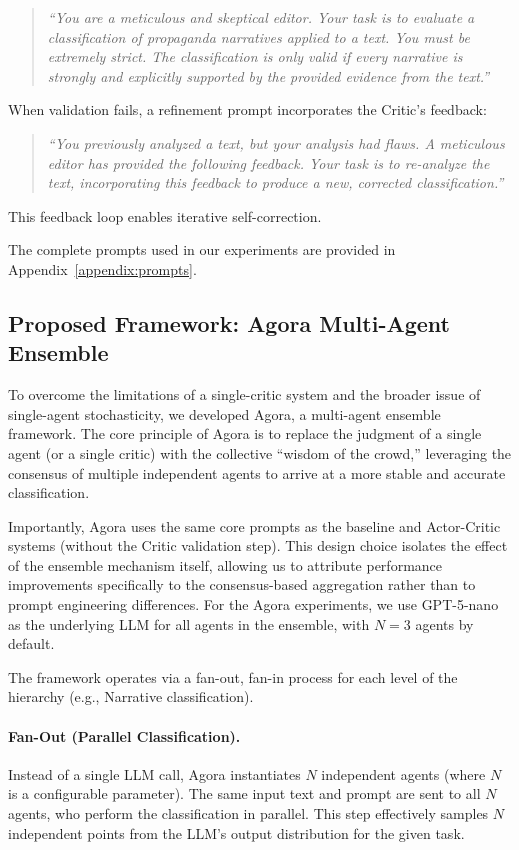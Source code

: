 \begin{quote}
    \small
\textit{``You are a meticulous and skeptical editor. Your task is to evaluate a classification of propaganda narratives applied to a text. You must be extremely strict. The classification is only valid if every narrative is strongly and explicitly supported by the provided evidence from the text.''}
\end{quote}

\noindent When validation fails, a refinement prompt incorporates the Critic's feedback: 
\begin{quote}
    \small
    \textit{``You previously analyzed a text, but your analysis had flaws. A meticulous editor has provided the following feedback. Your task is to re-analyze the text, incorporating this feedback to produce a new, corrected classification.''} 
\end{quote}
    \noindent This feedback loop enables iterative self-correction.

The complete prompts used in our experiments are provided in Appendix~\ref{appendix:prompts}.

\subsection{Proposed Framework: Agora Multi-Agent Ensemble}

To overcome the limitations of a single-critic system and the broader issue of single-agent stochasticity, we developed Agora, a multi-agent ensemble framework. The core principle of Agora is to replace the judgment of a single agent (or a single critic) with the collective ``wisdom of the crowd,'' leveraging the consensus of multiple independent agents to arrive at a more stable and accurate classification.

Importantly, Agora uses the same core prompts as the baseline and Actor-Critic systems (without the Critic validation step). This design choice isolates the effect of the ensemble mechanism itself, allowing us to attribute performance improvements specifically to the consensus-based aggregation rather than to prompt engineering differences. For the Agora experiments, we use GPT-5-nano as the underlying LLM for all agents in the ensemble, with $N=3$ agents by default.

The framework operates via a fan-out, fan-in process for each level of the hierarchy (e.g., Narrative classification).

\paragraph{Fan-Out (Parallel Classification).} 
Instead of a single LLM call, Agora instantiates $N$ independent agents (where $N$ is a configurable parameter). The same input text and prompt are sent to all $N$ agents, who perform the classification in parallel. This step effectively samples $N$ independent points from the LLM's output distribution for the given task.

